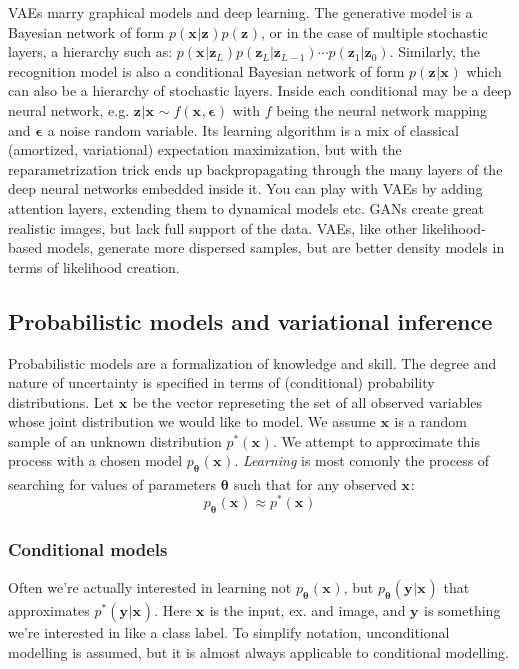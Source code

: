 \documentclass{article}
\begin{document}
VAEs marry graphical models and deep learning.
The generative model is a Bayesian network of form
$ p (\bm{x}_{}| \bm{z}_{})p (\bm{z}_{})  $,
or in the case of multiple stochastic layers, a hierarchy such as:
$ p (\bm{x}_{}| \bm{z}_{L})p (\bm{z}_{L}|\bm{z}_{L-1})\cdots p (\bm{z}_{1}|\bm{z}_{0})  $.
Similarly, the recognition model is also a conditional Bayesian network of
form $ p (\bm{z}_{}|\bm{x}_{})  $ which can also be a hierarchy of
stochastic layers.
Inside each conditional may be a deep neural network,
e.g. $ \bm{z}_{}|\bm{x}_{} \sim f (\bm{x}_{}, \bm{\epsilon}_{})  $
with $ f  $ being the neural network mapping and $ \bm{\epsilon}_{}  $ a
noise random variable.
Its learning algorithm is a mix of classical (amortized, variational)
expectation maximization, but with the reparametrization trick
ends up backpropagating through the many layers of the deep neural networks
embedded inside it.
You can play with VAEs by adding attention layers,
extending them to dynamical models etc.
GANs create great realistic images, but lack full support of the data.
VAEs, like other likelihood-based models, generate more dispersed samples,
but are better density models in terms of likelihood creation.


\subsection{Probabilistic models and variational inference}
Probabilistic models are a formalization of knowledge and skill.
The degree and nature of uncertainty is specified in terms
of (conditional) probability distributions.
Let $ \bm{x}_{}  $ be the vector represeting the set of all observed
variables whose joint distribution we would like to model.
We assume $ \bm{x}_{}  $ is a random sample of an unknown distribution
$ p^{ * } (\bm{x}_{})  $.
We attempt to approximate this process with a chosen model $ p_{ \bm{\theta}_{} } (\bm{x}_{})  $.
\textit{Learning} is most comonly the process of searching for values of parameters
$ \bm{\theta}_{}  $ such that for any observed $ \bm{x}_{}  $:
\begin{equation}
		p_{ \bm{\theta}_{} } (\bm{x}_{}) \approx  p^{ * } (\bm{x}_{})  
\end{equation}

\subsubsection{Conditional models}
Often we're actually interested in learning not $ p_{ \bm{\theta}_{} } (\bm{x}_{})  $,
but $ p_{ \bm{\theta}_{} } (\bm{y}_{}|\bm{x}_{})  $
that approximates $  p^{ * } (\bm{y}_{}|\bm{x}_{})    $.
Here $ \bm{x}_{}  $ is the input, ex. and image,
and $ \bm{y}_{}  $ is something we're interested in like a class label.
To simplify notation, unconditional modelling is assumed,
but it is almost always applicable to conditional modelling.
\end{document}
